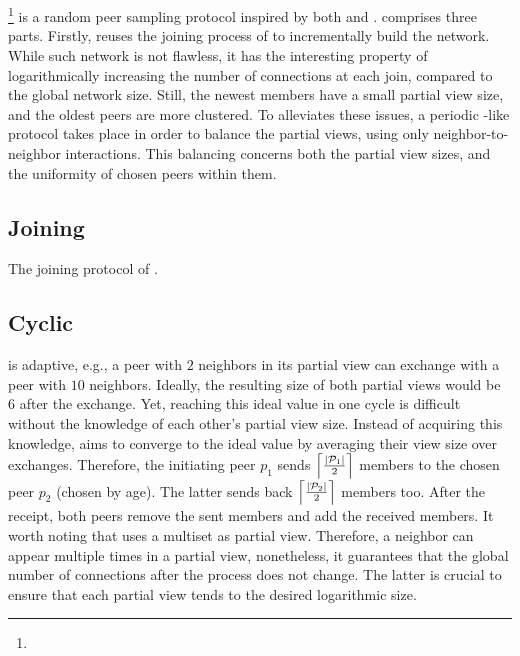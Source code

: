 
\section{\SCAMPLON{}}
\label{sec:proposal}

\SCAMPLON{}\footnote{\SCAMPLONDESCRIPTION{}} is a random peer sampling protocol
inspired by both \SCAMP{} and \CYCLON{}. \SCAMPLON{} comprises three parts.
Firstly, \SCAMPLON{} reuses the joining process of \SCAMP{} to incrementally
build the network. While such network is not flawless, it has the interesting
property of logarithmically increasing the number of connections at each join,
compared to the global network size. Still, the newest members have a small
partial view size, and the oldest peers are more clustered. To alleviates these
issues, a periodic \CYCLON{}-like protocol takes place in order to balance the
partial views, using only neighbor-to-neighbor interactions. This balancing
concerns both the partial view sizes, and the uniformity of chosen peers within
them.


\subsection{Joining}

\begin{algorithm}

\caption{\label{algo:joiningalgo.tex}The joining protocol of \SCAMPLON{}.}
\end{algorithm}

\subsection{Cyclic}

\SCAMPLON{} is adaptive, e.g., a peer with $2$ neighbors in its partial view
can exchange with a peer with $10$ neighbors. Ideally, the resulting size of
both partial views would be $6$ after the exchange. Yet, reaching this ideal
value in one cycle is difficult without the knowledge of each other's partial
view size. Instead of acquiring this knowledge, \SCAMPLON{} aims to converge to
the ideal value by averaging their view size over exchanges. Therefore, the
initiating peer $p_1$ sends $\left\lceil|\mathcal{P}_1|\over{2}\right\rceil$
members to the chosen peer $p_2$ (chosen by age). The latter sends back
$\left\lceil|\mathcal{P}_2|\over{2}\right\rceil$ members too. After the
receipt, both peers remove the sent members and add the received members. It
worth noting that \SCAMPLON{} uses a multiset as partial view. Therefore, a
neighbor can appear multiple times in a partial view, nonetheless, it
guarantees that the global number of connections after the process does not
change. The latter is crucial to ensure that each partial view tends to the
desired logarithmic size.


